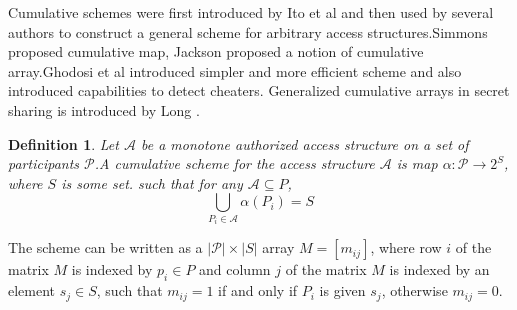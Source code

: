 \documentclass{llncs}
\newtheorem{defn}{Definition}
\begin{document}
Cumulative schemes were first introduced by Ito et al \cite{ito1989secret} and then used by several authors to construct a general scheme for arbitrary access structures.Simmons \cite{simmons1992} proposed cumulative map, Jackson \cite{jackson1993cumulative} proposed a notion of cumulative array.Ghodosi et al \cite{ghodosi1998construction} introduced simpler and more efficient scheme and also introduced capabilities to detect cheaters. 
Generalized cumulative arrays in secret sharing is introduced by Long \cite{long2006generalised}.
 \begin{defn} 
      Let $\mathcal{A}$ be a monotone authorized access structure on a set of participants $\mathcal{P}$.A cumulative scheme for the access structure $\mathcal{A}$ is map $\alpha:\mathcal{P} \longrightarrow 2^S$, where $S$ is some set. such that for any $\mathcal{A} \subseteq P$,
      $$ \bigcup_{P_i \in \mathcal{A}} \alpha(P_i)=S$$ 
 \end{defn}
      
The scheme can be written as a $|\mathcal{P}|\times |S|$ array $M=[m_{ij}]$, where row $i$ of the matrix $M$ is indexed by $p_i \in P$ and column $j$ of the matrix $M$ is indexed by an element $s_j \in S$, such that $m_{ij}=1$ if and only if $P_i$ is given $s_j$, otherwise $m_{ij}=0$.
\end{document}
